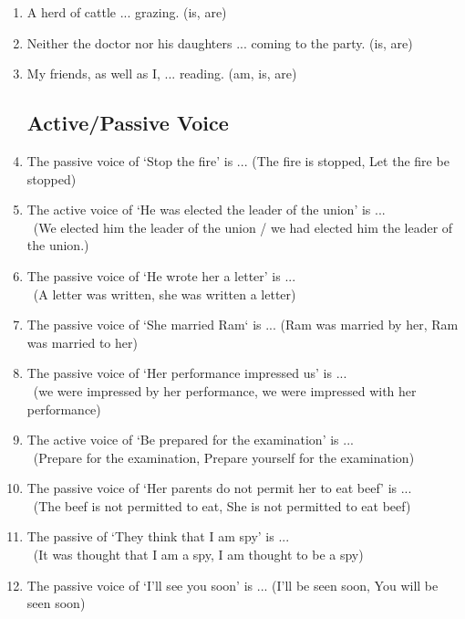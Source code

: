 \documentclass[12pt]{article}
\newcommand{\enter}{\\\textcolor{white}{1}}
\begin{document}
\begin{enumerate}
    \item A herd of cattle ... grazing. \hfill (is, are)

    \item Neither the doctor nor his daughters ... coming to the party. \hfill (is, are)

    \item My friends, as well as I, ... reading. \hfill (am, is, are)

  \subsection{Active/Passive Voice}
    \item The passive voice of `Stop the fire' is ... \hfill (The fire is stopped, Let the fire be stopped)
    
    \item The active voice of `He was elected the leader of the union' is ...
      \enter \hfill (We elected him the leader of the union / we had elected him the leader of the union.)
    
    \item The passive voice of `He wrote her a letter' is ...
      \enter\hfill (A letter was written, she was written a letter) 

     \item The passive voice of `She married Ram` is ... \hfill (Ram was married by her, Ram was married to her)

    \item The passive voice of `Her performance impressed us' is ... 
      \enter\hfill (we were impressed by her performance, we were impressed with her performance)

    \item The active voice of `Be prepared for the examination' is ... 
      \enter\hfill (Prepare for the examination, Prepare yourself for the examination)

    \item The passive voice of `Her parents do not permit her to eat beef' is ... 
      \enter\hfill (The beef is not permitted to eat, She is not permitted to eat beef)

    \item The passive of `They think that I am spy' is ... 
      \enter\hfill (It was thought that I am a spy, I am thought to be a spy)

    \item The passive voice of `I'll see you soon' is ... \hfill (I'll be seen soon, You will be seen soon)


\end{enumerate}
\end{document}
